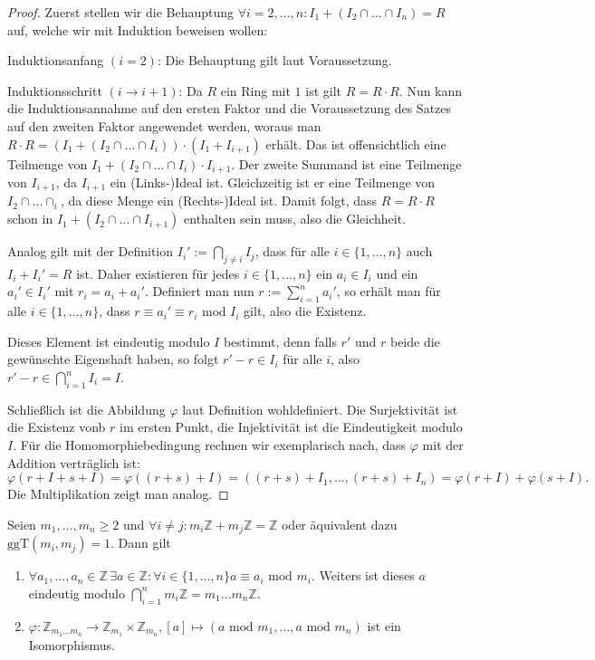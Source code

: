 \begin{proof}
    Zuerst stellen wir die Behauptung $\forall i=2,\ldots,n: I_1+(I_2\cap \ldots \cap I_n)=R$ auf, welche wir mit Induktion
    beweisen wollen:

    Induktionsanfang $(i=2)$: Die Behauptung gilt laut Voraussetzung.

    Induktionsschritt $(i\to i+1)$: Da $R$ ein Ring mit $1$ ist gilt
    $R=R\cdot R$. Nun kann die Induktionsannahme auf den ersten Faktor und die Voraussetzung des Satzes auf den zweiten Faktor angewendet werden,
    woraus man $R\cdot R=(I_1+(I_2\cap\ldots\cap I_i))\cdot(I_1+I_{i+1})$ erhält. Das ist offensichtlich eine Teilmenge
    von $I_1+(I_2\cap\ldots\cap I_i)\cdot I_{i+1}$. Der zweite Summand ist eine Teilmenge von $I_{i+1}$, da
    $I_{i+1}$ ein (Links-)Ideal ist. Gleichzeitig ist er eine Teilmenge von $I_2\cap\ldots \cap _i$, da diese Menge ein (Rechts-)Ideal ist.
    Damit folgt, dass $R=R\cdot R$ schon in $I_1+(I_2\cap\ldots \cap I_{i+1})$ enthalten sein muss, also die Gleichheit.

    Analog gilt mit der Definition $I_i':=\bigcap_{j\neq i}I_j$, dass für alle $i\in\{1,\ldots,n\}$
    auch $I_i+I_i'=R$ ist. Daher existieren für jedes $i\in\{1,\ldots,n\}$ ein $a_i\in I_i$ und ein $a_i'\in I_i'$
    mit $r_i=a_i+a_i'$. Definiert man nun $r:=\sum_{i=1}^na_i'$, so erhält man für alle $i\in\{1,\ldots,n\}$, dass
    $r\equiv a_i'\equiv r_i \text{ mod }I_i$ gilt, also die Existenz.

    Dieses Element ist eindeutig modulo $I$ bestimmt, denn falls $r'$ und $r$ beide die gewünschte Eigenshaft haben,
    so folgt $r'-r\in I_i$ für alle $i$, also $r'-r\in\bigcap_{i=1}^nI_i=I$.

    Schließlich ist die Abbildung $\varphi$ laut Definition wohldefiniert. Die Surjektivität ist die Existenz vonb $r$ im ersten Punkt,
    die Injektivität ist die Eindeutigkeit modulo $I$. Für die Homomorphiebedingung rechnen wir exemplarisch nach, dass
    $\varphi$ mit der Addition verträglich ist:
    $$\varphi(r+I+s+I)=\varphi((r+s)+I)=((r+s)+I_1,\ldots,(r+s)+I_n)=\varphi(r+I)+\varphi(s+I).$$
    Die Multiplikation zeigt man analog.
\end{proof}

\begin{corollary}
    Seien $m_1,\ldots,m_n\geq 2$ und $\forall i\neq j: m_i\mathbb{Z}+m_j\mathbb{Z}=\mathbb{Z}$
    oder äquivalent dazu $\text{ggT}(m_i,m_j)=1$. Dann gilt
    \begin{enumerate}
        \item $\forall a_1,\ldots,a_n\in\mathbb{Z}\,\exists a\in\mathbb{Z}:\forall i\in\{1,\ldots,n\}a\equiv a_i \text{ mod }m_i$.
        Weiters ist dieses $a$ eindeutig modulo $\bigcap_{i=1}^{n}m_i\mathbb{Z}=m_1\ldots m_n\mathbb{Z}$.
        \item $\varphi:\mathbb{Z}_{m_1\ldots m_n}\to \mathbb{Z}_{m_1}\times \mathbb{Z}_{m_n}, [a]\mapsto (a\text{ mod }m_1,\ldots, a\text{ mod }m_n)$
        ist ein Isomorphismus.
    \end{enumerate}
\end{corollary}


